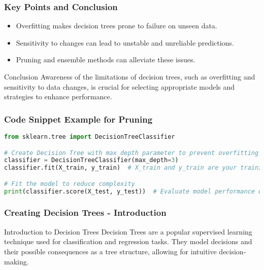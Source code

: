 \documentclass[aspectratio=169]{beamer}
\begin{document}
\begin{frame}[fragile]
    \frametitle{Key Points and Conclusion}
    \begin{itemize}
        \item Overfitting makes decision trees prone to failure on unseen data.
        \item Sensitivity to changes can lead to unstable and unreliable predictions.
        \item Pruning and ensemble methods can alleviate these issues.
    \end{itemize}

    \begin{block}{Conclusion}
        Awareness of the limitations of decision trees, such as overfitting and sensitivity to data changes, is crucial for selecting appropriate models and strategies to enhance performance.
    \end{block}
\end{frame}

\begin{frame}[fragile]
    \frametitle{Code Snippet Example for Pruning}
    \begin{lstlisting}[language=Python]
from sklearn.tree import DecisionTreeClassifier

# Create Decision Tree with max_depth parameter to prevent overfitting
classifier = DecisionTreeClassifier(max_depth=3)
classifier.fit(X_train, y_train)  # X_train and y_train are your training datasets

# Fit the model to reduce complexity
print(classifier.score(X_test, y_test))  # Evaluate model performance on test data
    \end{lstlisting}
\end{frame}

\begin{frame}[fragile]
    \frametitle{Creating Decision Trees - Introduction}
    \begin{block}{Introduction to Decision Trees}
        Decision Trees are a popular supervised learning technique used for classification and regression tasks. 
        They model decisions and their possible consequences as a tree structure, allowing for intuitive decision-making.
    \end{block}
\end{frame}
\end{document}
